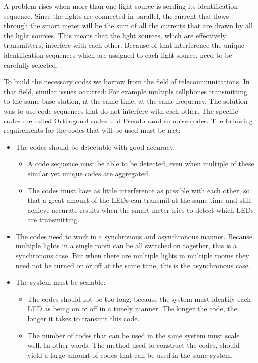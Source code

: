 	A problem rises when more than one light source is sending its identification sequence.
	Since the lights are connected in parallel, the current that flows through the smart meter will be the sum of all the currents that are drawn by all the light sources.
	This means that the light sources, which are effectively transmitters, interfere with each other.
	Because of that interference the unique identification sequences which are assigned to each light source, need to be carefully selected.


	To build the necessary codes we borrow from the field of telecommunications.
	In that field, similar issues occurred: For example multiple cellphones transmitting to the same base station, at the same time, at the same frequency. 
	The solution was to use code sequences that do not interfere with each other.
	The specific codes are called Orthogonal codes and Pseudo random noise codes.
	The following requirements for the codes that will be used must be met:
	\begin{itemize}

		\item The codes should be detectable with good accuracy:
		\begin{itemize}
			\item A code sequence must be able to be detected, even when multiple of these similar yet unique codes are aggregated.

			\item The codes must have as little interference as possible with each other, so that a great amount of the LEDs can transmit at the same time and still achieve accurate results when the smart-meter tries to detect which LEDs are transmitting.
		\end{itemize}


		\item The codes need to work in a synchronous and asynchronous manner. 
		Because multiple lights in a single room can be all switched on together, this is a synchronous case.	
		But when there are multiple lights in multiple rooms they need not be turned on or off at the same time, this is the asynchronous case.

		\item The system must be scalable:
		\begin{itemize}
			\item The codes should not be too long, because the system must identify each LED as being on or off in a timely manner.
			The longer the code, the longer it takes to transmit this code.

			\item The number of codes that can be used in the same system must scale well.
			In other words: The method used to construct the codes, should yield a large amount of codes that can be used in the same system.
		\end{itemize}

	\end{itemize}
	

